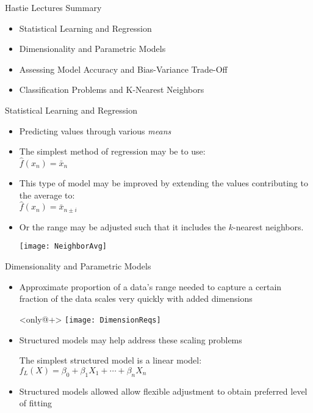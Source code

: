 \documentclass{beamer}
\begin{document}
\begin{frame}{Hastie Lectures Summary}
	\begin{itemize}
		\item Statistical Learning and Regression
		\item Dimensionality and Parametric Models
		\item Assessing Model Accuracy and Bias-Variance Trade-Off
		\item Classification Problems and K-Nearest Neighbors
	\end{itemize}
\end{frame}

\begin{frame}{Statistical Learning and Regression}
	\begin{itemize}[<+->]
		\item Predicting values through various \emph{means}
		\item The simplest method of regression may be to use: \\ 
			\vspace{0.5em} \hspace{4em} $ \hat{f}(x_n) = \bar{x}_n $
		\item This type of model may be improved by extending the values contributing to the average	to: \\ 
			\vspace{0.5em} \hspace{4em} $ \hat{f}(x_n) = \bar{x}_{n\pm i} $
		\item Or the range may be adjusted such that it includes the $k$-nearest neighbors.
		\item[] \hspace{4em} \texttt{[image: NeighborAvg]}
	\end{itemize}
\end{frame}

\begin{frame}[t]{Dimensionality and Parametric Models}
	\begin{itemize}[<+->]
		\item Approximate proportion of a data's range needed to capture a certain fraction of the data scales very quickly with added dimensions
		\item[]<only@+> \vspace{0.5em} \hspace{4em}
			\texttt{[image: DimensionReqs]}
		\item Structured models may help address these scaling problems
		\item[] The simplest structured model is a linear model: \\
			\vspace{0.5em} \hspace{4em} 
			$ f_L(X) = \beta_0 + \beta_1X_1 + \cdots + \beta_nX_n $
		\item Structured models allowed allow flexible adjustment to obtain preferred level of fitting
	\end{itemize}
\end{frame}
\end{document}
